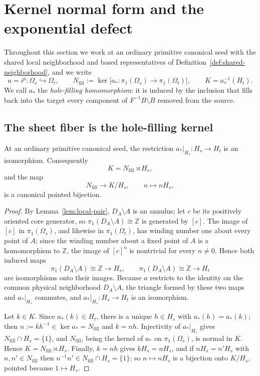 
\section{Kernel normal form and the exponential defect}
\label{sec:kernel}

Throughout this section we work at an ordinary primitive canonical seed
with the shared local neighborhood and based representatives of
Definition~\ref{def:shared-neighborhood}, and we write
\[
 a=i^{p}\colon\Omega_s\hookrightarrow\Omega_t,
 \qquad
 N_{\mathrm{fill}}:=\ker\bigl[a_*\colon\pi_1(\Omega_s)\to\pi_1(\Omega_t)\bigr],
 \qquad
 K=a_*^{-1}(H_t).
\]
We call $a_*$ the \emph{hole-filling homomorphism}: it is induced by the
inclusion that fills back into the target every component of
$F^{-1}B\setminus B$ removed from the source.

\subsection{The sheet fiber is the hole-filling kernel}

\begin{theorem}\label{thm:kernel-normal-form}
At an ordinary primitive canonical seed, the restriction
$a_*|_{H_s}\colon H_s\to H_t$ is an isomorphism.  Consequently
\[
 K=N_{\mathrm{fill}}\rtimes H_s,
\]
and the map
\[
 N_{\mathrm{fill}}\longrightarrow K/H_s,
 \qquad
 n\longmapsto nH_s,
\]
is a canonical pointed bijection.
\end{theorem}

\begin{proof}
By Lemma~\ref{lem:local-pair}, $D_A\setminus A$ is an annulus; let $c$
be its positively oriented core generator, so
$\pi_1(D_A\setminus A)\cong\mathbb Z$ is generated by $[c]$.  The image
of $[c]$ in $\pi_1(\Omega_s)$, and likewise in $\pi_1(\Omega_t)$, has
winding number one about every point of $A$; since the winding number
about a fixed point of $A$ is a homomorphism to $\mathbb Z$, the image
of $[c]^{n}$ is nontrivial for every $n\neq0$.  Hence both induced
maps
\[
 \pi_1(D_A\setminus A)\cong\mathbb Z\longrightarrow H_s,
 \qquad
 \pi_1(D_A\setminus A)\cong\mathbb Z\longrightarrow H_t
\]
are isomorphisms onto their images.  Because $a$ restricts to the
identity on the common physical neighborhood $D_A\setminus A$, the
triangle formed by these two maps and $a_*|_{H_s}$ commutes, and
$a_*|_{H_s}\colon H_s\to H_t$ is an isomorphism.

Let $k\in K$.  Since $a_*(k)\in H_t$, there is a unique $h\in H_s$ with
$a_*(h)=a_*(k)$; then $n:=kh^{-1}\in\ker a_*=N_{\mathrm{fill}}$ and
$k=nh$.  Injectivity of $a_*|_{H_s}$ gives
$N_{\mathrm{fill}}\cap H_s=\{1\}$, and $N_{\mathrm{fill}}$, being the
kernel of $a_*$ on $\pi_1(\Omega_s)$, is normal in $K$.  Hence
$K=N_{\mathrm{fill}}\rtimes H_s$.  Finally, $k=nh$ gives
$kH_s=nH_s$, and if $nH_s=n'H_s$ with
$n,n'\in N_{\mathrm{fill}}$ then
$n^{-1}n'\in N_{\mathrm{fill}}\cap H_s=\{1\}$; so
$n\mapsto nH_s$ is a bijection onto $K/H_s$, pointed because
$1\mapsto H_s$.
\end{proof}

